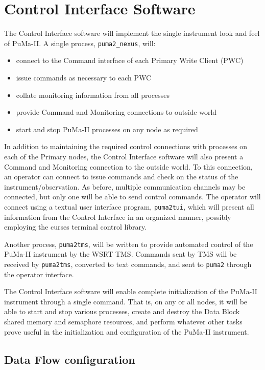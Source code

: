 \chapter{Control Interface Software}

The Control Interface software will implement the single instrument
look and feel of PuMa-II.  A single process, {\tt puma2\_nexus}, will:

\begin{itemize}
\item connect to the Command interface of each Primary Write Client (PWC)
\item issue commands as necessary to each PWC
\item collate monitoring information from all processes
\item provide Command and Monitoring connections to outside world
\item start and stop PuMa-II processes on any node as required
\end{itemize}

In addition to maintaining the required control connections with
processes on each of the Primary nodes, the Control Interface software
will also present a Command and Monitoring connection to the outside
world.  To this connection, an operator can connect to issue commands
and check on the status of the instrument/observation.  As before,
multiple communication channels may be connected, but only one will be
able to send control commands.  The operator will connect using a
textual user interface program, {\tt puma2tui}, which will present all
information from the Control Interface in an organized manner,
possibly employing the curses terminal control library.

Another process, {\tt puma2tms}, will be written to provide automated
control of the PuMa-II instrument by the WSRT TMS.  Commands sent by
TMS will be received by {\tt puma2tms}, converted to text commands,
and sent to {\tt puma2} through the operator interface.

The Control Interface software will enable complete initialization of
the PuMa-II instrument through a single command.  That is, on any or
all nodes, it will be able to start and stop various processes, create
and destroy the Data Block shared memory and semaphore resources, and
perform whatever other tasks prove useful in the initialization and
configuration of the PuMa-II instrument.

\section{Data Flow configuration}

